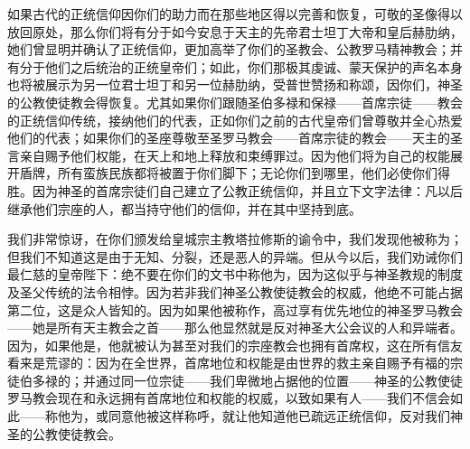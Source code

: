 \par

\par

如果古代的正统信仰因你们的助力而在那些地区得以完善和恢复，可敬的圣像得以放回原处，那么你们将有分于如今安息于天主的先帝君士坦丁大帝和皇后赫肋纳，她们曾显明并确认了正统信仰，更加高举了你们的圣教会、公教罗马精神教会；并有分于他们之后统治的正统皇帝们；如此，你们那极其虔诚、蒙天保护的声名本身也将被展示为另一位君士坦丁和另一位赫肋纳，受普世赞扬和称颂，因你们，神圣的公教使徒教会得恢复。尤其如果你们跟随圣伯多禄和保禄——首席宗徒——教会的正统信仰传统，接纳他们的代表，正如你们之前的古代皇帝们曾尊敬并全心热爱他们的代表；如果你们的圣座尊敬至圣罗马教会——首席宗徒的教会——天主的圣言亲自赐予他们权能，在天上和地上释放和束缚罪过。因为他们将为自己的权能展开盾牌，所有蛮族民族都将被置于你们脚下；无论你们到哪里，他们必使你们得胜。因为神圣的首席宗徒们自己建立了公教正统信仰，并且立下文字法律：凡以后继承他们宗座的人，都当持守他们的信仰，并在其中坚持到底。\par

\par

\par

我们非常惊讶，在你们颁发给皇城宗主教塔拉修斯的谕令中，我们发现他被称为；但我们不知道这是由于无知、分裂，还是恶人的异端。但从今以后，我们劝诫你们最仁慈的皇帝陛下：绝不要在你们的文书中称他为，因为这似乎与神圣教规的制度及圣父传统的法令相悖。因为若非我们神圣公教使徒教会的权威，他绝不可能占据第二位，这是众人皆知的。因为如果他被称作，高过享有优先地位的神圣罗马教会——她是所有天主教会之首——那么他显然就是反对神圣大公会议的人和异端者。因为，如果他是，他就被认为甚至对我们的宗座教会也拥有首席权，这在所有信友看来是荒谬的：因为在全世界，首席地位和权能是由世界的救主亲自赐予有福的宗徒伯多禄的；并通过同一位宗徒——我们卑微地占据他的位置——神圣的公教使徒罗马教会现在和永远拥有首席地位和权能的权威，以致如果有人——我们不信会如此——称他为，或同意他被这样称呼，就让他知道他已疏远正统信仰，反对我们神圣的公教使徒教会。\par

\par

